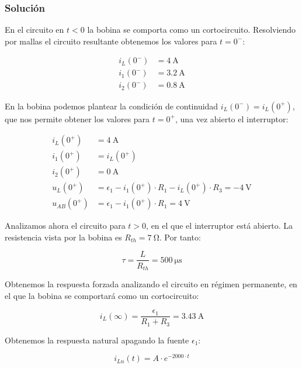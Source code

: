 \documentclass[12pt]{article}
\begin{document}
\subsubsection*{Solución}

En el circuito en $t <0$ la bobina se comporta como un
cortocircuito. Resolviendo por mallas el circuito resultante obtenemos
los valores para $t = 0^-$:

\begin{align*}
  i_L(0^-) &= \qty{4}{\ampere}\\
  i_1(0^-) &= \qty{3.2}{\ampere}\\
  i_2(0^-) &= \qty{0.8}{\ampere}
\end{align*}

En la bobina podemos plantear la condición de continuidad
$i_L(0^-) = i_L(0^+)$, que nos permite obtener los valores para
$t = 0^+$, una vez abierto el interruptor:

\begin{align*}
  i_L(0^+) &= \qty{4}{\ampere}\\
  i_1(0^+) &= i_L(0^+)\\
  i_2(0^+) &= \qty{0}{\ampere}\\
  u_L(0^+) &= \epsilon_1 - i_1(0^+) \cdot R_1 - i_L(0^+) \cdot R_3 = -\qty{4}{\volt}\\
  u_{AB}(0^+) &= \epsilon_1 - i_1(0^+) \cdot R_1 = \qty{4}{\volt}
\end{align*}

Analizamos ahora el circuito para $t > 0$, en el que el interruptor
está abierto. La resistencia vista por la bobina es
$R_{th} = \qty{7}{\ohm}$. Por tanto:

\begin{equation*}
  \tau = \frac{L}{R_{th}} = \qty{500}{\micro\second}
\end{equation*}

Obtenemos la respuesta forzada analizando el circuito en régimen
permanente, en el que la bobina se comportará como un cortocircuito:

\begin{equation*}
  i_{L}(\infty) = \frac{\epsilon_1}{R_1 + R_3} = \qty{3.43}{\ampere}
\end{equation*}

Obtenemos la respuesta natural apagando la fuente $\epsilon_1$:

\begin{equation*}
  i_{Ln}(t) = A \cdot e^{-2000 \cdot t}
\end{equation*}
\end{document}
